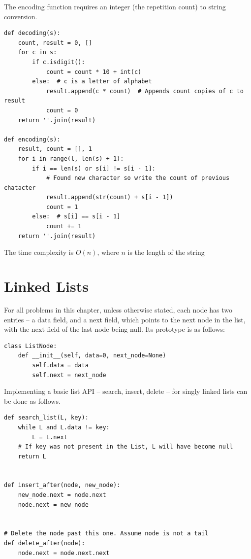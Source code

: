 \documentclass[11pt,a4paper]{article}
\begin{document}
The encoding function requires an integer (the repetition count) to string
conversion.

\begin{verbatim}
def decoding(s):
    count, result = 0, [] 
    for c in s:
        if c.isdigit():
            count = count * 10 + int(c)
        else:  # c is a letter of alphabet
            result.append(c * count)  # Appends count copies of c to result 
            count = 0
    return ''.join(result)

def encoding(s):
    result, count = [], 1
    for i in range(l, len(s) + 1):
        if i == len(s) or s[i] != s[i - 1]:
            # Found new character so write the count of previous chatacter
            result.append(str(count) + s[i - 1])
            count = 1
        else:  # s[i] == s[i - 1]
            count += 1
    return ''.join(result)
\end{verbatim}  

The time complexity is $O(n)$, where $n$ is the length of the string

\section{Linked Lists}

For all problems in this chapter, unless otherwise stated, each node has two
entries -- a data field, and a next field, which points to the next node in
the list, with the next field of the last node being null. Its prototype is as
follows:

\begin{verbatim}
class ListNode:
    def __init__(self, data=0, next_node=None)
        self.data = data 
        self.next = next_node  
\end{verbatim}  

Implementing a basic list API -- search, insert, delete -- for singly linked
lists can be done as follows.

\begin{verbatim}
def search_list(L, key): 
    while L and L.data != key:
        L = L.next
    # If key was not present in the List, L will have become null 
    return L


def insert_after(node, new_node):
    new_node.next = node.next
    node.next = new_node


# Delete the node past this one. Assume node is not a tail 
def delete_after(node):
    node.next = node.next.next
\end{verbatim}  
\end{document}
